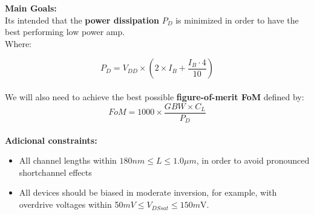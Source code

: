 \newpage

\textbf{Main Goals:}\\

Its intended that the \textbf{power dissipation} $P_D$ is minimized in order to have the best performing low power amp.\\

Where: 

$$P_D = V_{DD} \times \left(2 \times I_B + \dfrac{I_B\cdot 4}{10}\right) $$\\

 We will also need to achieve the best possible \textbf{figure-of-merit FoM} defined by: \\

$$FoM = 1000 \times \dfrac{GBW \times C_L}{P_D}$$\\

\textbf{Adicional constraints:}\\
\begin{itemize}
 \item All channel lengths within $180 nm \leqslant L \leqslant 1.0 \mu m$, in order to avoid pronounced shortchannel effects
 \item All devices should be biased in moderate inversion, for example, with overdrive voltages within 5$0
mV \leqslant V_{DSsat} \leqslant 150 m$V.
\end{itemize}
